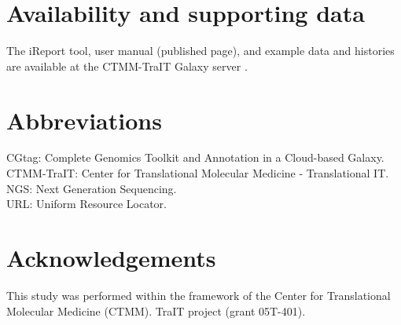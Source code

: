 
\section*{Availability and supporting data}
The iReport tool, user manual (published page), and example data and histories are available at the CTMM-TraIT Galaxy server \cite{url-traitgalaxy}.

\section*{Abbreviations}
CGtag: Complete Genomics Toolkit and Annotation in a Cloud-based Galaxy. \\
CTMM-TraIT: Center for Translational Molecular Medicine - Translational IT. \\
NGS: Next Generation Sequencing. \\
URL: Uniform Resource Locator. \\


\section*{Acknowledgements}
 This study was performed within the framework of the Center for Translational Molecular Medicine (CTMM). TraIT project (grant 05T-401).



